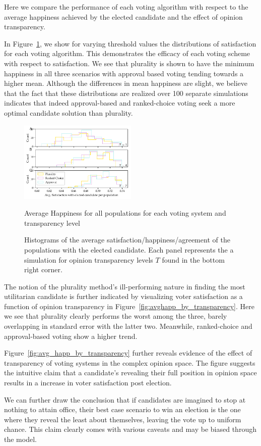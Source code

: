 Here we compare the performance of each voting algorithm with respect to the average happiness achieved by the elected candidate and 
the effect of opinion transparency. \par
In Figure~\ref{fig:satisfaction_hists}, we show for varying threshold values the distributions of satisfaction for each
voting algorithm. This demonstrates the efficacy of each voting scheme with respect to satisfaction. We see that plurality
is shown to have the minimum happiness in all three scenarios with approval based voting tending towards a higher mean.
Although the differences in mean happiness are slight, we believe that the fact that these distributions are realized over
100 separate simulations indicates that indeed approval-based and ranked-choice voting seek a more optimal candidate solution
than plurality.
\begin{figure}[h!]
\includegraphics[width=0.5\textwidth]{../src/figs/new/satisfaction-hist_avgperpop.pdf}
\caption{Average Happiness for all populations for each voting system and transparency level}
\label{fig:satisfaction_hists}
    \caption{Histograms of the average satisfaction/happiness/agreement of the populations with the elected
    candidate. Each panel represents the a simulation for opinion transparency levels $T$ found
    in the bottom right corner. }
\end{figure}
The notion of the plurality method's ill-performing nature in finding the most utilitarian candidate
is further indicated by visualizing voter satisfaction as a function of opinion transparency in Figure~\ref{fig:avghapp_by_transparency}.
Here we see that plurality clearly performs the worst among the three, barely overlapping in standard error with the latter two.
Meanwhile, ranked-choice and approval-based voting show a higher trend.\par 
Figure~\ref{fig:avg_happ_by_transparency} further reveals evidence of the effect of 
transparency of voting systems in the complex opinion space. The figure suggests the 
intuitive claim that a candidate's revealing their full position in opinion space
results in a increase in voter satisfaction post election.\par
We can further draw the conclusion that if candidates are imagined to stop at nothing to attain office,
their best case scenario to win an election is the one where they reveal the least about themselves,
leaving the vote up to uniform chance. This claim clearly comes with various caveats and may be biased
through the model.

